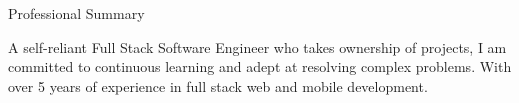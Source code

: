 \documentclass{resume} %
\begin{document}

\begin{rSection}{Professional Summary}

{A self-reliant Full Stack Software Engineer who takes ownership of projects, I am committed to continuous learning and adept at resolving complex problems. With over 5 years of experience in full stack web and mobile development.}

\end{rSection}

\end{document}

